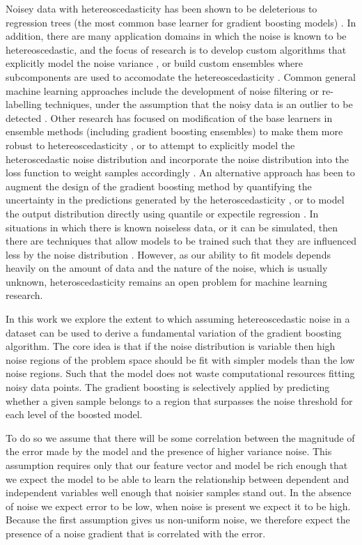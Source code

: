 \documentclass[graybox]{svmult}
\begin{document}
Noisey data with hetereoscedasticity has been shown to be deleterious to regression trees (the most
common base learner for gradient boosting models) \cite{ruth2016effect}. In addition, there are
many application domains in which the noise is known to be hetereoscedastic, and the focus of
research is to develop custom algorithms that explicitly model the noise variance \cite{Zhenxing2020,Zhang2023},
or build custom ensembles where subcomponents are used to accomodate the hetereoscedasticity \cite{Zeng2022}. 
Common general machine learning approaches include the development
of noise filtering or re-labelling techniques, under the assumption that the noisy data is an
outlier to be detected \cite{Ustinovskiy2016}. Other research has focused on modification of the base 
learners in ensemble methods (including gradient boosting ensembles) to make them more robust to 
hetereoscedasticity \cite{Henrey2016}, or to attempt to explicitly model the heteroscedastic noise
distribution \cite{Natarajan2009,Thomas2018} and incorporate the noise distribution into the loss function to 
weight samples accordingly \cite{Lee2017}. 
An alternative approach has been to augment the design of the gradient boosting method 
by quantifying the uncertainty in the predictions generated by the heteroscedasticity \cite{brophy2022},
or to model the output distribution directly using quantile or expectile regression \cite{Yang2014}.
In situations in which
there is known noiseless data, or it can be simulated, then there are techniques that allow models to
be trained such that they are influenced less by the noise distribution \cite{Wu2021}. However, as our 
ability to fit models depends heavily on the amount of data and the nature of the noise, which is usually
unknown, heteroscedasticity remains an open problem for machine learning research.

In this work we explore the extent to which assuming hetereoscedastic noise in a dataset can be used
to derive a fundamental variation of the gradient boosting algorithm. 
The core idea is that if the noise distribution is variable then high noise regions of the problem space should be fit with simpler
models than the low noise regions. Such that the model does not waste computational resources fitting
noisy data points. The gradient boosting is selectively applied by predicting whether a given sample
belongs to a region that surpasses the noise threshold for each level of the boosted model.

To do so we assume that there will be some correlation between the magnitude of the error made
by the model and the presence of higher variance noise. This assumption requires only that our feature
vector and model be rich enough that we expect the model to be able to learn the
relationship between dependent and independent variables well enough that noisier samples stand out.
In the absence of noise we expect error to be low, when noise is present we expect it to be high.
Because the first assumption gives us non-uniform noise, we therefore expect the presence
of a noise gradient that is correlated with the error.
\end{document}
